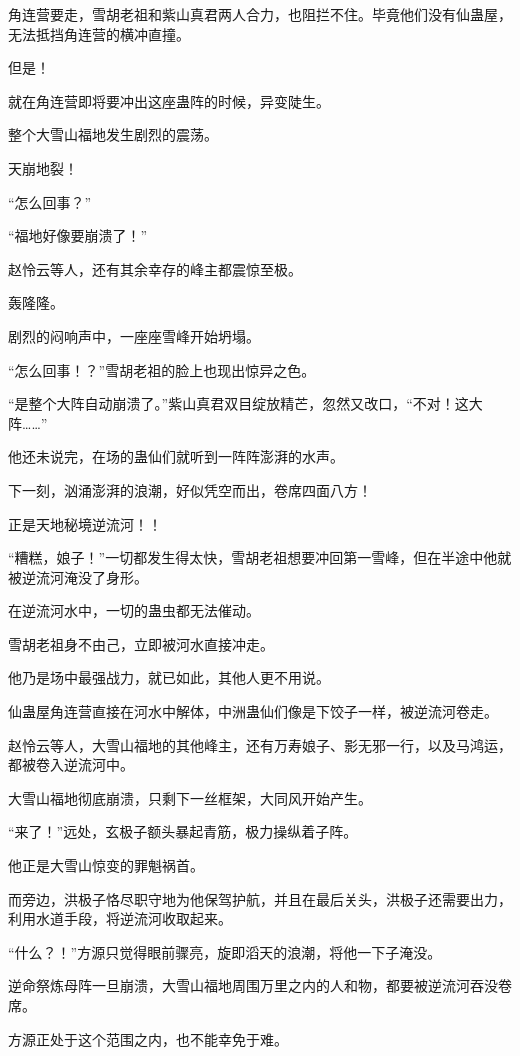 \begin{this_body}
角连营要走，雪胡老祖和紫山真君两人合力，也阻拦不住。毕竟他们没有仙蛊屋，无法抵挡角连营的横冲直撞。

但是！

就在角连营即将要冲出这座蛊阵的时候，异变陡生。

整个大雪山福地发生剧烈的震荡。

天崩地裂！

“怎么回事？”

“福地好像要崩溃了！”

赵怜云等人，还有其余幸存的峰主都震惊至极。

轰隆隆。

剧烈的闷响声中，一座座雪峰开始坍塌。

“怎么回事！？”雪胡老祖的脸上也现出惊异之色。

“是整个大阵自动崩溃了。”紫山真君双目绽放精芒，忽然又改口，“不对！这大阵……”

他还未说完，在场的蛊仙们就听到一阵阵澎湃的水声。

下一刻，汹涌澎湃的浪潮，好似凭空而出，卷席四面八方！

正是天地秘境逆流河！！

“糟糕，娘子！”一切都发生得太快，雪胡老祖想要冲回第一雪峰，但在半途中他就被逆流河淹没了身形。

在逆流河水中，一切的蛊虫都无法催动。

雪胡老祖身不由己，立即被河水直接冲走。

他乃是场中最强战力，就已如此，其他人更不用说。

仙蛊屋角连营直接在河水中解体，中洲蛊仙们像是下饺子一样，被逆流河卷走。

赵怜云等人，大雪山福地的其他峰主，还有万寿娘子、影无邪一行，以及马鸿运，都被卷入逆流河中。

大雪山福地彻底崩溃，只剩下一丝框架，大同风开始产生。

“来了！”远处，玄极子额头暴起青筋，极力操纵着子阵。

他正是大雪山惊变的罪魁祸首。

而旁边，洪极子恪尽职守地为他保驾护航，并且在最后关头，洪极子还需要出力，利用水道手段，将逆流河收取起来。

“什么？！”方源只觉得眼前骤亮，旋即滔天的浪潮，将他一下子淹没。

逆命祭炼母阵一旦崩溃，大雪山福地周围万里之内的人和物，都要被逆流河吞没卷席。

方源正处于这个范围之内，也不能幸免于难。


\end{this_body}
